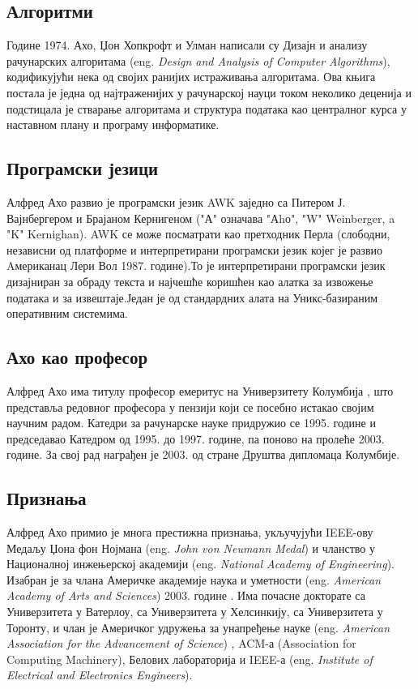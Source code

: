 \documentclass[a4paper]{article}
\begin{document}
\subsection{Алгоритми}
\label{subsec:podnaslov4}
Године 1974. Ахо, Џон Хопкрофт и Улман написали су Дизајн и анализу рачунарских алгоритама (eng. \emph{Design and Analysis of Computer Algorithms}), кодификујући нека од својих ранијих истраживања алгоритама. Ова књига постала је једна од најтраженијих у рачунарској науци током неколико деценија и подстицала је стварање алгоритама и структура података као централног курса у наставном плану и програму информатике.


\subsection{Програмски језици}
\label{subsec:podnaslov5}
Алфред Ахо развио је програмски језик AWK заједно са Питером Ј. Вајнбергером и Брајаном Кернигеном ("А" означава "Аhо", "W" Weinberger, a "K" Kernighan). AWK се може посматрати као претходник Перла (слободни, независни од платформе и интерпретирани програмски језик којег је развио Aмериканац Лери Вол 1987. године).То је интерпретирани програмски језик дизајниран за обраду текста и најчешће коришћен као алатка за извожење података и за извештаје.Један је од стандардних алата на Уникс-базираним оперативним системима.

\subsection{Ахо као професор}
\label{subsec:podnaslov6}
Алфред Ахо има титулу професор емеритус на Универзитету Колумбија \cite {landc.cs.columbia.edu}, што представља редовног професора у пензији који се посебно истакао својим научним радом. Катедри за рачунарске науке придружио се 1995. године и председавао Катедром од 1995. до 1997. године, па поново на пролеће 2003. године. За свој рад награђен је 2003. \cite {Google Scholar Record for Alfred Aho} од стране Друштва дипломаца Колумбије. 

\subsection{Признања}
\label{subsec:podnaslov7}
Алфред Ахо примио је многа престижна признања, укључујући IEEE-ову Медаљу Џона фон Нојмана (eng. \emph {John von Neumann Medal}) и чланство у Националној инжењерској академији (eng. \emph {National Academy of Engineering}). Изабран је за члана Америчке академије наука и уметности (eng. \emph {American Academy of Arts and Sciences}) 2003. године \cite {Brief U.S. Suppression of Proof Stirs Anger}. Има почасне докторате са Универзитета у Ватерлоу, са Универзитета у Хелсинкију, са Универзитета у Торонту, и члан је Америчког удружења за унапређење науке (eng. \emph{American Association for the Advancement of Science}) , ACM-а (Association for Computing Machinery), Белових лабораторија и IEEE-а (eng. \emph {Institute of Electrical and Electronics Engineers}). 
\end{document}
